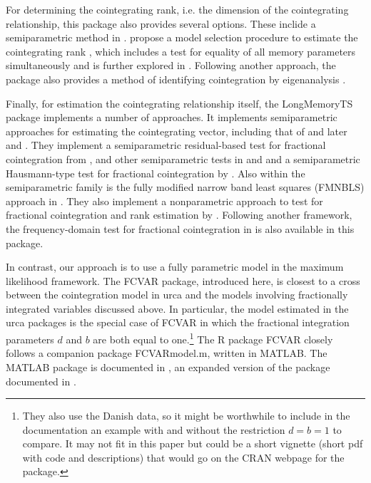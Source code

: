 \documentclass[11pt,letterpaper]{paper}
\newcommand{\pkg}[1]{{\normalfont\fontseries{b}\selectfont #1}}
\let\proglang=\textsf
\begin{document}
For determining the cointegrating rank, i.e. the dimension of the cointegrating relationship, this package also provides several options. 
These inclide a semiparametric method in \citet{ChenHurvich2003}. 
\citet{RobinsonYajima2002} propose a model selection procedure to estimate the cointegrating rank ,
which includes a test for equality of all memory parameters simultaneously and is further explored in \citet{NielsenShimotsu2007}. 
Following another approach, the package also provides a method of
identifying cointegration by eigenanalysis \citep{ZhangRobinsonYao2018}. 


Finally, for estimation the cointegrating relationship itself, the \pkg{LongMemoryTS} package implements a number of approaches. 
It implements semiparametric approaches for estimating the cointegrating vector, including that of 
\citet{Robinson1994} and later \citet{RobinsonMarinucci2003} and \citet{ChristensenNielsen2006}. 
They implement a semiparametric residual-based test for fractional cointegration from \citet{ChenHurvich2006}, 
and other semiparametric tests in \citet{MarmolVelasco2004}and \citet{WangWangChan2015}
and a semiparametric Hausmann-type test for fractional cointegration by \citet{Robinson2008}. 
Also within the semiparametric family is the fully modified narrow band least squares (FMNBLS) approach in  \citet{NielsenFrederiksen2011}. 
% 
They also implement a nonparametric approach to test for fractional cointegration and rank estimation by \citet{Nielsen2010}.
Following another framework, the frequency-domain test for fractional cointegration in \citet{SouzaEtal2018} is also available in this package. 

In contrast, our approach is to use a fully parametric model in the maximum likelihood framework. 
The \pkg{FCVAR} package, introduced here, is closest to a cross between the \citet{Johansen1995} cointegration model in \pkg{urca} and the models involving fractionally integrated variables discussed above. 
In particular, the model estimated in the \pkg{urca} packages is the special case of \pkg{FCVAR} in which the fractional integration parameters $d$ and $b$ are both equal to one.\footnote{They also use the Danish data, so it might be worthwhile to include in the documentation an example with and without the restriction $d = b = 1$ to compare. It may not fit in this paper but could be a short vignette (short pdf with code and descriptions) that would go on the CRAN webpage for the package. } 
% 
% 
% 
The \proglang{R} package \pkg{FCVAR} closely follows a companion package \pkg{FCVARmodel.m}, written in \proglang{MATLAB}. 
The \proglang{MATLAB} package is documented in \cite{Nielsen2016}, an expanded version of the package documented in \cite{Nielsen2013}. 








% 

\end{document}
